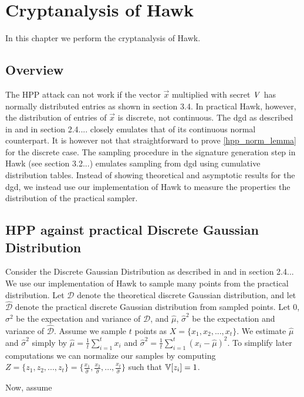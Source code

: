 
\newcommand{\dgd}{\mathcal{D}}
\newcommand{\dgdi}{\widehat{\mathcal{D}}}

\chapter{Cryptanalysis of Hawk}
In this chapter we perform the cryptanalysis of Hawk.
\section{Overview}


The HPP attack can not work if the vector $\vec{x}$ multiplied with secret $\mathit{V}$ has normally distributed entries as shown in section 3.4.
In practical Hawk, however, the distribution of entries of $\vec{x}$ is discrete, not continuous. The \gls{dgd} as described in \cite{HawkSpec24} and in section 2.4.... closely emulates
that of its continuous normal counterpart. It is however not that straightforward to prove \ref{hpp_norm_lemma} for the discrete case.
The sampling procedure in the signature generation step in Hawk (see section 3.2...) emulates sampling from \gls{dgd} using cumulative distribution tables.
Instead of showing theoretical and asymptotic results for the \gls{dgd}, we instead use our implementation of Hawk to measure the properties the distribution of the practical sampler.

\section{HPP against practical Discrete Gaussian Distribution}
Consider the Discrete Gaussian Distribution as described in \cite{HawkSpec24} and in section 2.4... We use our implementation of Hawk to sample many points from the practical distribution.
Let $\dgd$ denote the theoretical discrete Gaussian distribution, and let $\dgdi$ denote the practical discrete Gaussian distribution from sampled points.
Let $0$, $\sigma^2$ be the expectation and variance of $\dgd$, and $\hat{\mu}$, $\hat{\sigma}^2$ be the expectation and variance of $\dgdi$.
Assume we sample $t$ points as $X = \{x_1, x_2, ..., x_t\}$. We estimate $\hat{\mu}$ and $\hat{\sigma}^2$ simply by $\hat{\mu} = \frac{1}{t} \sum_{i=1}^{t} x_i$ and $\hat{\sigma}^2 = \frac{1}{t} \sum_{i=1}^{t}(x_i - \hat{\mu})^2$.
To simplify later computations we can normalize our samples by computing $Z = \{z_1, z_2, ..., z_t\} = \{\frac{x_1}{\hat{\sigma}}, \frac{x_2}{\hat{\sigma}},..., \frac{x_t}{\hat{\sigma}}\}$ such that 
$\mathbb{V}[z_i] = 1$.

Now, assume
